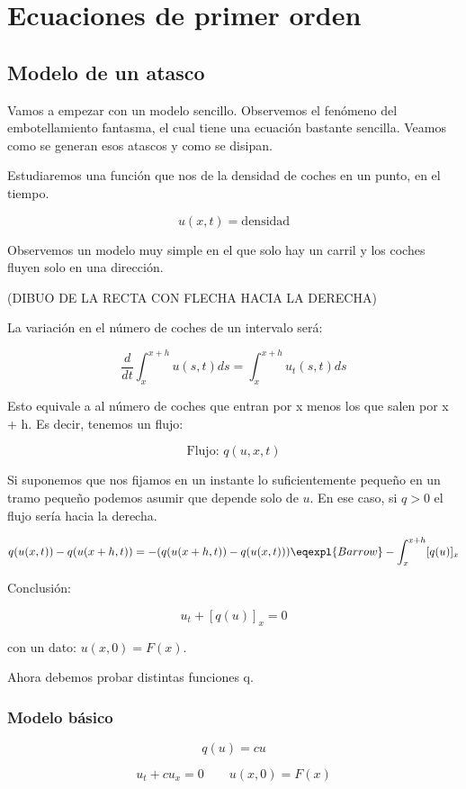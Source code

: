\chapter{Ecuaciones de primer orden}

\section{Modelo de un atasco}

	Vamos a empezar con un modelo sencillo. Observemos el fenómeno del embotellamiento fantasma, el cual tiene una ecuación bastante sencilla. Veamos como se generan esos atascos y como se disipan.

	Estudiaremos una función que nos de la densidad de coches en un punto, en el tiempo.

	$$u(x,t) = \text{densidad}$$

	Observemos un modelo muy simple en el que solo hay un carril y los coches fluyen solo en una dirección.

	(DIBUO DE LA RECTA CON FLECHA HACIA LA DERECHA)

	La variación en el número de coches de un intervalo será:

	$$ \frac{d}{dt} \int^{x+h}_{x} u(s,t) ds = \int^{x+h}_{x} u_t(s,t) ds $$

	Esto equivale a al número de coches que entran por x menos los que salen por x + h. Es decir, tenemos un flujo:

	$$\text{Flujo: } q(u, x, t)$$

	Si suponemos que nos fijamos en un instante lo suficientemente pequeño en un tramo pequeño podemos asumir que depende solo de $u$. En ese caso, si $q > 0$ el flujo sería hacia la derecha.

	$$ q(u(x,t)) - q(u(x+h,t)) = -( q(u(x+h,t)) -  q(u(x,t)) ) \eqexpl{Barrow} -\int^{x+h}_{x} [q(u)]_{x} $$

	Conclusión:

	$$ u_t + [q(u)]_{x} = 0$$

	con un dato: $u(x, 0) = F(x)$.

	Ahora debemos probar distintas funciones q.


	\subsection{Modelo básico}

		$$q(u) = cu$$

		$$u_t + cu_x = 0 \quad\quad u(x,0) = F(x)$$


